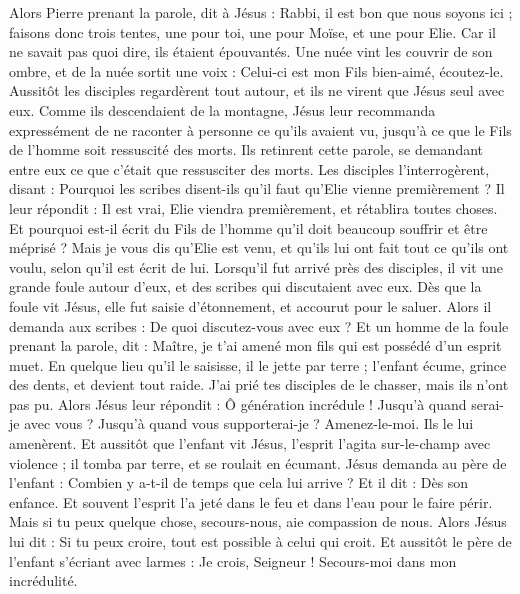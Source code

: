 \begin{multicols}{2}
Alors Pierre prenant la parole, dit à Jésus : Rabbi, il est bon que nous soyons ici ; faisons donc trois tentes, une pour toi, une pour Moïse, et une pour Elie.
Car il ne savait pas quoi dire, ils étaient épouvantés.
Une nuée vint les couvrir de son ombre, et de la nuée sortit une voix : Celui-ci est mon Fils bien-aimé, écoutez-le.
Aussitôt les disciples regardèrent tout autour, et ils ne virent que Jésus seul avec eux.
Comme ils descendaient de la montagne, Jésus leur recommanda expressément de ne raconter à personne ce qu'ils avaient vu, jusqu’à ce que le Fils de l'homme soit ressuscité des morts.
Ils retinrent cette parole, se demandant entre eux ce que c'était que ressusciter des morts.
Les disciples l'interrogèrent, disant : Pourquoi les scribes disent-ils qu'il faut qu'Elie vienne premièrement ?
Il leur répondit : Il est vrai, Elie viendra premièrement, et rétablira toutes choses. Et pourquoi est-il écrit du Fils de l'homme qu’il doit beaucoup souffrir et être méprisé ?
Mais je vous dis qu’Elie est venu, et qu'ils lui ont fait tout ce qu’ils ont voulu, selon qu’il est écrit de lui.
Lorsqu’il fut arrivé près des disciples, il vit une grande foule autour d’eux, et des scribes qui discutaient avec eux.
Dès que la foule vit Jésus, elle fut saisie d'étonnement, et accourut pour le saluer.
Alors il demanda aux scribes : De quoi discutez-vous avec eux ?
Et un homme de la foule prenant la parole, dit : Maître, je t'ai amené mon fils qui est possédé d’un esprit muet.
En quelque lieu qu’il le saisisse, il le jette par terre ; l’enfant écume, grince des dents, et devient tout raide. J’ai prié tes disciples de le chasser, mais ils n'ont pas pu.
Alors Jésus leur répondit : Ô génération incrédule ! Jusqu’à quand serai-je avec vous ? Jusqu’à quand vous supporterai-je ? Amenez-le-moi. Ils le lui amenèrent.
Et aussitôt que l’enfant vit Jésus, l'esprit l'agita sur-le-champ avec violence ; il tomba par terre, et se roulait en écumant.
Jésus demanda au père de l'enfant : Combien y a-t-il de temps que cela lui arrive ? Et il dit : Dès son enfance.
Et souvent l’esprit l’a jeté dans le feu et dans l'eau pour le faire périr. Mais si tu peux quelque chose, secours-nous, aie compassion de nous.
Alors Jésus lui dit : Si tu peux croire, tout est possible à celui qui croit.
Et aussitôt le père de l'enfant s'écriant avec larmes : Je crois, Seigneur ! Secours-moi dans mon incrédulité.

\end{multicols}
